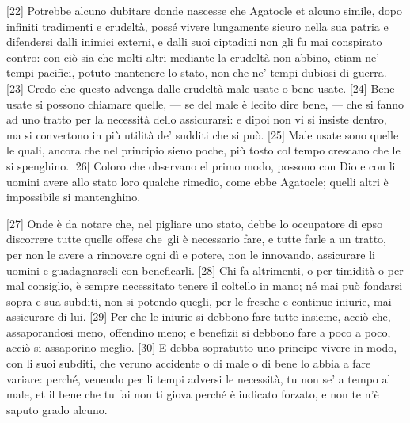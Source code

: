 {[}22{]} Potrebbe alcuno dubitare donde nascesse che Agatocle et alcuno
simile, dopo infiniti tradimenti e crudeltà, possé vivere lungamente
sicuro nella sua patria e difendersi dalli inimici externi, e dalli suoi
ciptadini non gli fu mai conspirato contro: con ciò sia che molti altri
mediante la crudeltà non abbino, etiam ne' tempi pacifici, potuto
mantenere lo stato, non che ne' tempi dubiosi di guerra. {[}23{]} Credo
che questo advenga dalle crudeltà male usate o bene usate. {[}24{]} Bene
usate si possono chiamare quelle, --- se del male è lecito dire bene, ---
che si fanno ad uno tratto per la necessità dello assicurarsi: e dipoi
non vi si insiste dentro, ma si convertono in più utilità de' sudditi
che si può. {[}25{]} Male usate sono quelle le quali, ancora che nel
principio sieno poche, più tosto col tempo crescano che le si spenghino.
{[}26{]} Coloro che observano el primo modo, possono con Dio e con li
uomini avere allo stato loro qualche rimedio, come ebbe Agatocle; quelli
altri è impossibile si mantenghino.

{[}27{]} Onde è da notare che, nel pigliare uno stato, debbe lo
occupatore di epso discorrere tutte quelle offese che\est\ gli è necessario
fare, e tutte farle a un tratto, per non le avere a rinnovare ogni dì e
potere, non le innovando, assicurare li uomini e guadagnarseli con
beneficarli. {[}28{]} Chi fa altrimenti, o per timidità o per mal
consiglio, è sempre necessitato tenere il coltello in mano; né mai può
fondarsi sopra e sua subditi, non si potendo quegli, per le fresche e
continue iniurie, mai assicurare di lui. {[}29{]} Per che le iniurie si
debbono fare tutte insieme, acciò che, assaporandosi meno, offendino
meno; e benefizii si debbono fare a poco a poco, acciò si assaporino
meglio. {[}30{]} E debba sopratutto uno principe vivere in modo, con li
suoi subditi, che veruno accidente o di male o di bene lo abbia a fare
variare: perché, venendo per li tempi adversi le necessità, tu non se' a
tempo al male, et il bene che tu fai non ti giova perché è iudicato
forzato, e non te n'è saputo grado alcuno.


